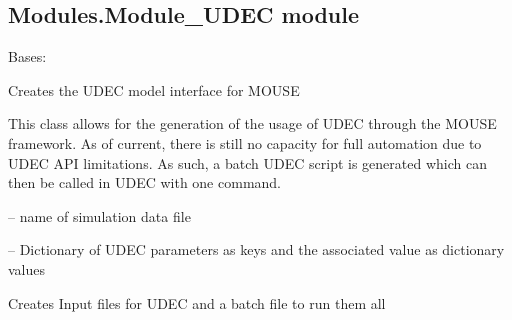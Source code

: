 \documentclass[letterpaper,10pt,english]{sphinxmanual}
\begin{document}
\subsection{Modules.Module\_UDEC module}
\label{\detokenize{MouseReferenceManual:modules-module-udec-module}}\label{\detokenize{MouseReferenceManual:module-Modules.Module_UDEC}}

\begin{fulllineitems}
\label{\detokenize{MouseReferenceManual:Modules.Module_UDEC.Module_UDEC}}
Bases: {\hyperref[\detokenize{MouseReferenceManual:Modules.Base.DemModuleBaseClass}]{}}

Creates the UDEC model interface for MOUSE

This class allows for the generation of the usage of UDEC through the MOUSE framework. As of current, there is still no capacity for full automation due to UDEC API limitations. As such, a batch UDEC script is generated which can then be called in UDEC with one command.

\begin{fulllineitems}
\label{\detokenize{MouseReferenceManual:Modules.Module_UDEC.Module_UDEC.fileName}}
 -- name of simulation data file

\end{fulllineitems}


\begin{fulllineitems}
\label{\detokenize{MouseReferenceManual:Modules.Module_UDEC.Module_UDEC.UDECParameters}}
 -- Dictionary of UDEC parameters as keys and the associated value as dictionary values

\end{fulllineitems}


\begin{fulllineitems}
\label{\detokenize{MouseReferenceManual:Modules.Module_UDEC.Module_UDEC.createInputFiles}}
Creates Input files for UDEC and a batch file to run them all


\end{fulllineitems}
\end{fulllineitems}
\end{document}

